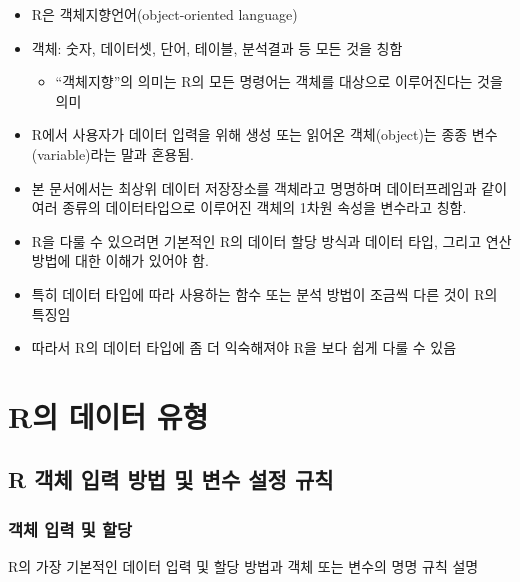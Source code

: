 \documentclass[11pt,a4paper]{book}
\providecommand{\tightlist}{%
  \setlength{\itemsep}{0pt}\setlength{\parskip}{0pt}}
\theoremstyle{definition}
\theoremstyle{definition}
\theoremstyle{definition}
\theoremstyle{remark}
\begin{document}
\begin{itemize}
\tightlist
\item
  R은 객체지향언어(object-oriented language)
\item
  객체: 숫자, 데이터셋, 단어, 테이블, 분석결과 등 모든 것을 칭함

  \begin{itemize}
  \tightlist
  \item
    ``객체지향''의 의미는 R의 모든 명령어는 객체를 대상으로 이루어진다는
    것을 의미
  \end{itemize}
\item
  R에서 사용자가 데이터 입력을 위해 생성 또는 읽어온 객체(object)는 종종
  변수(variable)라는 말과 혼용됨.
\item
  본 문서에서는 최상위 데이터 저장장소를 객체라고 명명하며
  데이터프레임과 같이 여러 종류의 데이터타입으로 이루어진 객체의 1차원
  속성을 변수라고 칭함.
\item
  R을 다룰 수 있으려면 기본적인 R의 데이터 할당 방식과 데이터 타입,
  그리고 연산 방법에 대한 이해가 있어야 함.
\item
  특히 데이터 타입에 따라 사용하는 함수 또는 분석 방법이 조금씩 다른
  것이 R의 특징임
\item
  따라서 R의 데이터 타입에 좀 더 익숙해져야 R을 보다 쉽게 다룰 수 있음
\end{itemize}

\section{R의 데이터 유형}\label{r--}

\subsection{R 객체 입력 방법 및 변수 설정 규칙}\label{r-------}

\subsubsection{객체 입력 및 할당}\label{---}

R의 가장 기본적인 데이터 입력 및 할당 방법과 객체 또는 변수의 명명 규칙
설명
\end{document}
